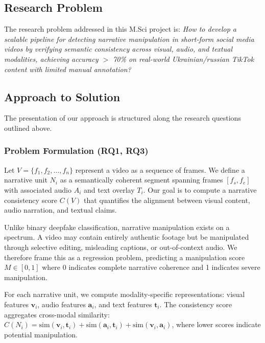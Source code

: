 \documentclass[runningheads]{llncs}
\begin{document}
\subsection{Research Problem}

The research problem addressed in this M.Sci project is: \textit{How to develop a scalable pipeline for detecting narrative manipulation in short-form social media videos by verifying semantic consistency across visual, audio, and textual modalities, achieving accuracy $>$ 70\% on real-world Ukrainian/russian TikTok content with limited manual annotation?}

\subsection{Approach to Solution}

The presentation of our approach is structured along the research questions outlined above.

\subsubsection{Problem Formulation (RQ1, RQ3)}

Let $V = \{f_1, f_2, \ldots, f_n\}$ represent a video as a sequence of frames. We define a narrative unit $N_i$ as a semantically coherent segment spanning frames $[f_s, f_e]$ with associated audio $A_i$ and text overlay $T_i$. Our goal is to compute a narrative consistency score $C(V)$ that quantifies the alignment between visual content, audio narration, and textual claims.

Unlike binary deepfake classification, narrative manipulation exists on a spectrum. A video may contain entirely authentic footage but be manipulated through selective editing, misleading captions, or out-of-context audio. We therefore frame this as a regression problem, predicting a manipulation score $M \in [0, 1]$ where 0 indicates complete narrative coherence and 1 indicates severe manipulation.

For each narrative unit, we compute modality-specific representations: visual features $\mathbf{v}_i$, audio features $\mathbf{a}_i$, and text features $\mathbf{t}_i$. The consistency score aggregates cross-modal similarity: $C(N_i) = \text{sim}(\mathbf{v}_i, \mathbf{t}_i) + \text{sim}(\mathbf{a}_i, \mathbf{t}_i) + \text{sim}(\mathbf{v}_i, \mathbf{a}_i)$, where lower scores indicate potential manipulation.
\end{document}
